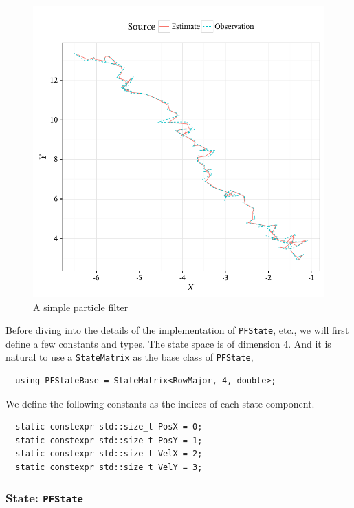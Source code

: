\begin{figure}
  \includegraphics{fig/pf}
  \caption{A simple particle filter}
  \label{fig:pf}
\end{figure}

Before diving into the details of the implementation of \verb|PFState|, etc.,
we will first define a few constants and types. The state space is of dimension
$4$. And it is natural to use a \verb|StateMatrix| as the base class of
\verb|PFState|,
\begin{Verbatim}
  using PFStateBase = StateMatrix<RowMajor, 4, double>;
\end{Verbatim}
We define the following constants as the indices of each state component.
\begin{Verbatim}
  static constexpr std::size_t PosX = 0;
  static constexpr std::size_t PosY = 1;
  static constexpr std::size_t VelX = 2;
  static constexpr std::size_t VelY = 3;
\end{Verbatim}

\subsubsection{State: \texttt{PFState}}

